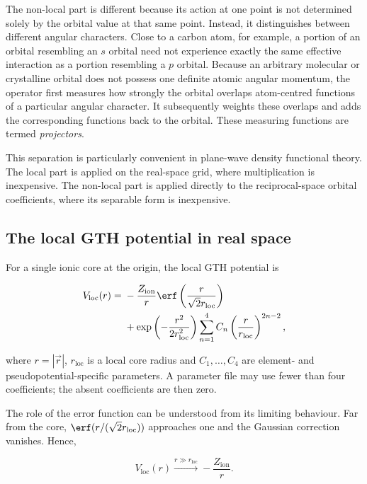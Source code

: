 The non-local part is different because its action at one point is not determined solely by the orbital value at that same point. Instead, it distinguishes between different angular characters. Close to a carbon atom, for example, a portion of an orbital resembling an $s$ orbital need not experience exactly the same effective interaction as a portion resembling a $p$ orbital. Because an arbitrary molecular or crystalline orbital does not possess one definite atomic angular momentum, the operator first measures how strongly the orbital overlaps atom-centred functions of a particular angular character. It subsequently weights these overlaps and adds the corresponding functions back to the orbital. These measuring functions are termed \textit{projectors}.

This separation is particularly convenient in plane-wave density functional theory. The local part is applied on the real-space grid, where multiplication is inexpensive. The non-local part is applied directly to the reciprocal-space orbital coefficients, where its separable form is inexpensive.

%
%
%
\subsection{The local GTH potential in real space}

For a single ionic core at the origin, the local GTH potential is

\begin{align}
    V_{\text{loc}}(r) ={}& -\frac{Z_{\text{ion}}}{r}
    \erf\left(\frac{r}{\sqrt{2}r_{\text{loc}}}\right) \nonumber\\
    &+ \exp\left(-\frac{r^{2}}{2r_{\text{loc}}^{2}}\right)
    \sum_{n=1}^{4} C_{n}
    \left(\frac{r}{r_{\text{loc}}}\right)^{2n-2},
    \label{eq:gth-local-real}
\end{align}

where $r=|\vec{r}|$, $r_{\text{loc}}$ is a local core radius and $C_{1},\ldots,C_{4}$ are element- and pseudopotential-specific parameters. A parameter file may use fewer than four coefficients; the absent coefficients are then zero.

The role of the error function can be understood from its limiting behaviour. Far from the core, $\erf(r/(\sqrt{2}r_{\text{loc}}))$ approaches one and the Gaussian correction vanishes. Hence,

\begin{equation}
    V_{\text{loc}}(r) \xrightarrow{r\gg r_{\text{loc}}}
    -\frac{Z_{\text{ion}}}{r}.
\end{equation}

